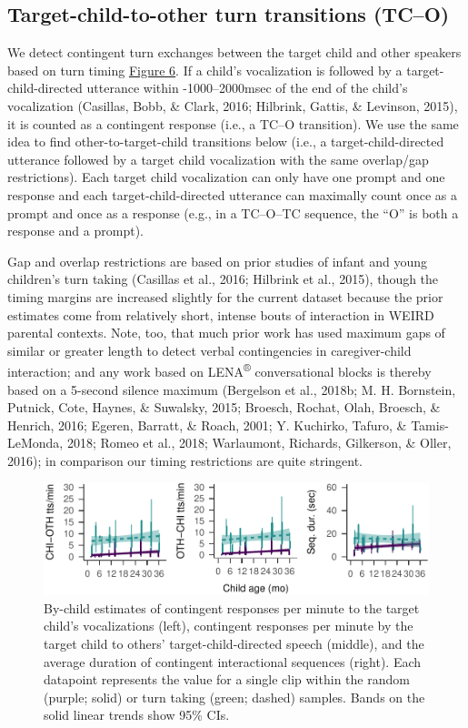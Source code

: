 \documentclass[floatsintext,man]{apa6}
\theoremstyle{definition}
\theoremstyle{definition}
\theoremstyle{definition}
\theoremstyle{remark}
\begin{document}
\subsection{Target-child-to-other turn transitions
(TC--O)}\label{target-child-to-other-turn-transitions-tco}

We detect contingent turn exchanges between the target child and other
speakers based on turn timing \protect\hyperlink{fig6}{Figure 6}. If a
child's vocalization is followed by a target-child-directed utterance
within -1000--2000msec of the end of the child's vocalization (Casillas,
Bobb, \& Clark, 2016; Hilbrink, Gattis, \& Levinson, 2015), it is
counted as a contingent response (i.e., a TC--O transition). We use the
same idea to find other-to-target-child transitions below (i.e., a
target-child-directed utterance followed by a target child vocalization
with the same overlap/gap restrictions). Each target child vocalization
can only have one prompt and one response and each target-child-directed
utterance can maximally count once as a prompt and once as a response
(e.g., in a TC--O--TC sequence, the \enquote{O} is both a response and a
prompt).

Gap and overlap restrictions are based on prior studies of infant and
young children's turn taking (Casillas et al., 2016; Hilbrink et al.,
2015), though the timing margins are increased slightly for the current
dataset because the prior estimates come from relatively short, intense
bouts of interaction in WEIRD parental contexts. Note, too, that much
prior work has used maximum gaps of similar or greater length to detect
verbal contingencies in caregiver-child interaction; and any work based
on LENA\textsuperscript{®} conversational blocks is thereby based on a
5-second silence maximum (Bergelson et al., 2018b; M. H. Bornstein,
Putnick, Cote, Haynes, \& Suwalsky, 2015; Broesch, Rochat, Olah,
Broesch, \& Henrich, 2016; Egeren, Barratt, \& Roach, 2001; Y. Kuchirko,
Tafuro, \& Tamis-LeMonda, 2018; Romeo et al., 2018; Warlaumont,
Richards, Gilkerson, \& Oller, 2016); in comparison our timing
restrictions are quite stringent.

\begin{figure}
\centering
\includegraphics{Tseltal-CLE_files/figure-latex/fig7-1.pdf}
\caption{\label{fig:fig7}By-child estimates of contingent responses per
minute to the target child's vocalizations (left), contingent responses
per minute by the target child to others' target-child-directed speech
(middle), and the average duration of contingent interactional sequences
(right). Each datapoint represents the value for a single clip within
the random (purple; solid) or turn taking (green; dashed) samples. Bands
on the solid linear trends show 95\% CIs.}
\end{figure}
\end{document}
